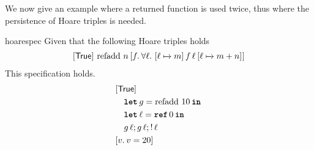 \documentclass[thesis.tex]{subfiles}
\begin{document}
We now give an example where a returned function is used twice, thus where the persistence of Hoare triples is needed.
\begin{lemma}{}{hoarespec}
    Given that the following Hoare triples holds $$\hoare{\TRUE}{\operatorname{refadd}\, n}{\Ret f. {\forall \loc.\ \hoare{\loc \fmapsto m}{f\, \loc}{\loc\fmapsto m + n}}}$$
    This specification holds.
    \[
        \begin{aligned}
             & \rightbracket{\TRUE}                         \\
             & \quad \Let g = \operatorname{refadd}\, 10 in \\
             & \quad \Let \loc = \Alloc 0 in                \\
             & \quad g\, \loc; g\, \loc; \deref \loc        \\
             & \rightbracket{\Ret \val. \val = 20}
        \end{aligned}
    \]
\end{lemma}
\end{document}
